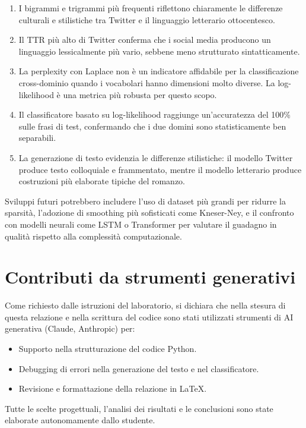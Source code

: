 \documentclass[12pt, a4paper]{article}
\begin{document}
\begin{enumerate}
    \item I bigrammi e trigrammi più frequenti riflettono chiaramente
          le differenze culturali e stilistiche tra Twitter e il
          linguaggio letterario ottocentesco.

    \item Il TTR più alto di Twitter conferma che i social media
          producono un linguaggio lessicalmente più vario,
          sebbene meno strutturato sintatticamente.

    \item La perplexity con Laplace non è un indicatore affidabile
          per la classificazione cross-dominio quando i vocabolari
          hanno dimensioni molto diverse. La log-likelihood è
          una metrica più robusta per questo scopo.

    \item Il classificatore basato su log-likelihood raggiunge
          un'accuratezza del 100\% sulle frasi di test, confermando
          che i due domini sono statisticamente ben separabili.

    \item La generazione di testo evidenzia le differenze stilistiche:
          il modello Twitter produce testo colloquiale e frammentato,
          mentre il modello letterario produce costruzioni più
          elaborate tipiche del romanzo.
\end{enumerate}

Sviluppi futuri potrebbero includere l'uso di dataset più grandi
per ridurre la sparsità, l'adozione di smoothing più sofisticati
come Kneser-Ney, e il confronto con modelli neurali come LSTM o
Transformer per valutare il guadagno in qualità rispetto alla
complessità computazionale.

\section*{Contributi da strumenti generativi}


Come richiesto dalle istruzioni del laboratorio, si dichiara che
nella stesura di questa relazione e nella scrittura del codice
sono stati utilizzati strumenti di AI generativa (Claude, Anthropic)
per:

\begin{itemize}
    \item Supporto nella strutturazione del codice Python.
    \item Debugging di errori nella generazione del testo e nel
          classificatore.
    \item Revisione e formattazione della relazione in \LaTeX.
\end{itemize}

Tutte le scelte progettuali, l'analisi dei risultati e le conclusioni
sono state elaborate autonomamente dallo studente.

\end{document}
